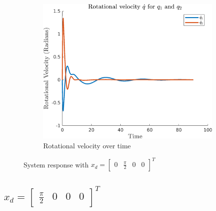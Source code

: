 \documentclass{article}
\begin{document}
\begin{figure}[H]
\begin{subfigure}{0.325\textwidth}
        \centering
        \includegraphics[width = \textwidth]{figures/rotational-velocity-b1.png}
        \caption{Rotational velocity over time}
    \end{subfigure}
    \caption{System response with $x_d=\begin{bmatrix} 0 & \frac{\pi}{2} & 0 & 0 \end{bmatrix}^T$}
    \label{fig:b-1_results}
\end{figure}

\subsection*{$x_d = \begin{bmatrix}\frac{\pi}{2} & 0 & 0 & 0 \end{bmatrix}^T$}
\end{document}

